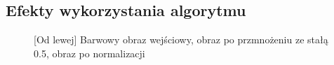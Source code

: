 \documentclass[a4paper,12pt, titlepage]{report}
\begin{document}
\subsection*{Efekty wykorzystania algorytmu}
\begin{figure}[h]
    \centering
    \caption{[Od lewej] Barwowy obraz wejściowy, obraz po przmnożeniu ze stałą 0.5, obraz po normalizacji}%
    \label{fig:rysunek}%
\end{figure}
\FloatBarrier
\end{document}
